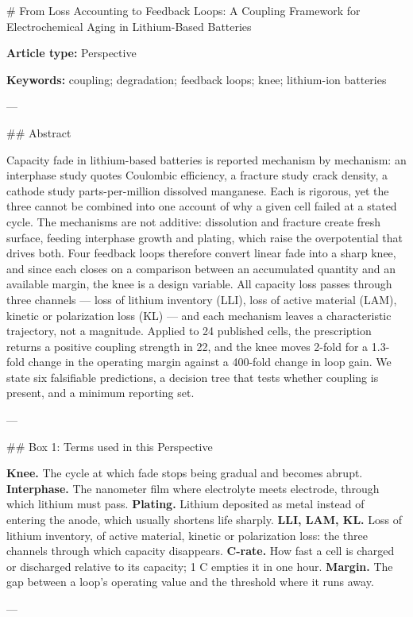 # From Loss Accounting to Feedback Loops: A Coupling Framework for Electrochemical Aging in Lithium-Based Batteries

\textbf{Article type:} Perspective

\textbf{Keywords:} coupling; degradation; feedback loops; knee; lithium-ion batteries

---

## Abstract

Capacity fade in lithium-based batteries is reported mechanism by mechanism: an interphase study quotes Coulombic efficiency, a fracture study crack density, a cathode study parts-per-million dissolved manganese. Each is rigorous, yet the three cannot be combined into one account of why a given cell failed at a stated cycle. The mechanisms are not additive: dissolution and fracture create fresh surface, feeding interphase growth and plating, which raise the overpotential that drives both. Four feedback loops therefore convert linear fade into a sharp knee, and since each closes on a comparison between an accumulated quantity and an available margin, the knee is a design variable. All capacity loss passes through three channels --- loss of lithium inventory (LLI), loss of active material (LAM), kinetic or polarization loss (KL) --- and each mechanism leaves a characteristic trajectory, not a magnitude. Applied to 24 published cells, the prescription returns a positive coupling strength in 22, and the knee moves 2-fold for a 1.3-fold change in the operating margin against a 400-fold change in loop gain. We state six falsifiable predictions, a decision tree that tests whether coupling is present, and a minimum reporting set.

---

## Box 1: Terms used in this Perspective

\textbf{Knee.} The cycle at which fade stops being gradual and becomes abrupt. \textbf{Interphase.} The nanometer film where electrolyte meets electrode, through which lithium must pass. \textbf{Plating.} Lithium deposited as metal instead of entering the anode, which usually shortens life sharply. \textbf{LLI, LAM, KL.} Loss of lithium inventory, of active material, kinetic or polarization loss: the three channels through which capacity disappears. \textbf{C-rate.} How fast a cell is charged or discharged relative to its capacity; 1 C empties it in one hour. \textbf{Margin.} The gap between a loop's operating value and the threshold where it runs away.

---

